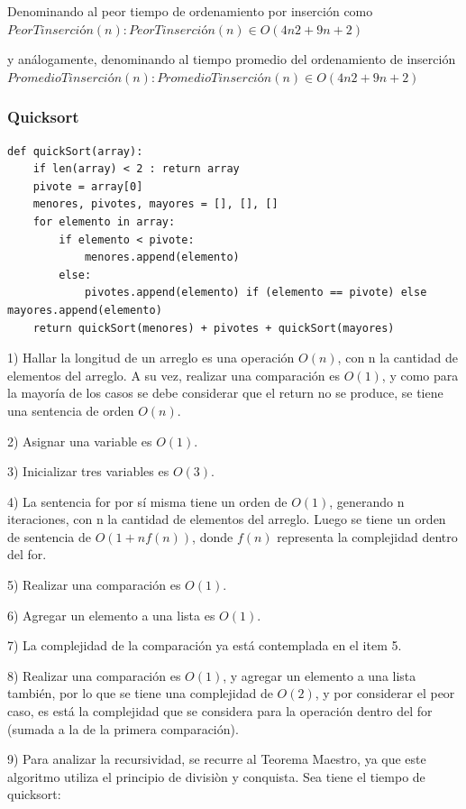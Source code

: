 \documentclass[titlepage,a4paper]{article}
\begin{document}
Denominando al peor tiempo de ordenamiento por inserción como $PeorTinserción(n):
PeorTinserción(n) \in O(4n2 + 9n + 2)$

y análogamente, denominando al tiempo promedio del ordenamiento de inserción $PromedioTinserción(n):
PromedioTinserción(n) \in O(4n2 + 9n + 2) $

\subsubsection{Quicksort}
\begin{verbatim}
def quickSort(array):
    if len(array) < 2 : return array
    pivote = array[0]
    menores, pivotes, mayores = [], [], []
    for elemento in array:
        if elemento < pivote:
            menores.append(elemento)
        else:
            pivotes.append(elemento) if (elemento == pivote) else mayores.append(elemento)            
    return quickSort(menores) + pivotes + quickSort(mayores)
\end{verbatim}

1) Hallar la longitud de un arreglo es una operación $O(n)$, con n la cantidad de elementos del arreglo. A su vez, realizar una comparación es $O(1)$, y como para la mayoría de los casos se debe considerar que el return no se produce, se tiene una sentencia de orden $O(n)$. 

2) Asignar una variable es $O(1)$.

3) Inicializar tres variables es $O(3)$.

4) La sentencia for por sí misma tiene un orden de $O(1)$, generando n iteraciones, con n la cantidad de elementos del arreglo. Luego se tiene un orden de sentencia de $O(1 + nf(n))$, donde $f(n)$ representa la complejidad dentro del for.

5) Realizar una comparación es $O(1)$.

6) Agregar un elemento a una lista es $O(1)$.

7) La complejidad de la comparación ya está contemplada en el item 5.

8) Realizar una comparación es $O(1)$, y agregar un elemento a una lista también, por lo que se tiene una complejidad de $O(2)$, y por considerar el peor caso, es está la complejidad que se considera para la operación dentro del for (sumada a la de la primera comparación).

9) Para analizar la recursividad, se recurre al Teorema Maestro, ya que este algoritmo utiliza el principio de divisiòn y conquista. Sea tiene el tiempo de quicksort:
\end{document}
